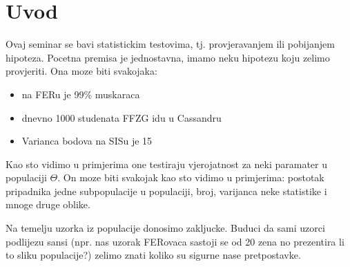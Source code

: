 \chapter{Uvod}
\label{Chapter1} %

Ovaj seminar se bavi statistickim testovima, tj. provjeravanjem ili pobijanjem hipoteza. Pocetna premisa je jednostavna, imamo neku hipotezu koju zelimo provjeriti. Ona moze biti svakojaka:

\begin{itemize}
	\item na FERu je 99\% muskaraca 
	\item dnevno 1000 studenata FFZG idu u Cassandru
	\item Varianca bodova na SISu je 15
\end{itemize}

Kao sto vidimo u primjerima one testiraju vjerojatnost za neki paramater u populaciji $\Theta$. On moze biti svakojak kao sto vidimo u primjerima: postotak pripadnika jedne subpopulacije u populaciji, broj, varijanca neke statistike i mnoge druge oblike.

Na temelju uzorka iz populacije donosimo zakljucke. Buduci da sami uzorci podlijezu sansi (npr. nas uzorak FERovaca sastoji se od 20 zena no prezentira li to sliku populacije?) zelimo znati koliko su sigurne nase pretpostavke.

